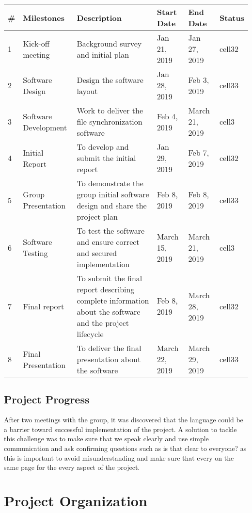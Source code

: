 \documentclass{article}
\begin{document}
\begin{center}
\begin{tabular}{ | m{3em} | m{2cm}| m{3cm} | m{1cm} | m{1cm} | m{1cm} |}
\hline
\textbf{\#} & \textbf{Milestones} & \textbf{Description} & \textbf{Start Date} & \textbf{End Date} & \textbf{Status}  \\
\hline
1 & Kick-off meeting & Background survey and initial plan & Jan 21, 2019 & Jan 27, 2019 & cell32 \\
\hline
2 & Software Design  & Design the software layout & Jan 28, 2019 & Feb 3, 2019 & cell33 \\
\hline
3 & Software Development & Work to deliver the file synchronization software & Feb 4, 2019 & March 21, 2019 & cell3 \\
\hline
4 & Initial Report & To develop and submit the initial report & Jan 29, 2019 & Feb 7, 2019 & cell32 \\
\hline
5 & Group Presentation & To demonstrate  the group initial software design and share the project plan & Feb 8, 2019 & Feb 8, 2019 & cell33 \\
\hline
6 & Software Testing &  To test the software and ensure correct and secured implementation & March 15, 2019 & March 21, 2019 & cell3 \\
\hline
7 & Final report & To submit the final report describing complete information about the software and the project lifecycle & Feb 8, 2019 & March 28, 2019 & cell32 \\
\hline
8 & Final Presentation & To deliver the final presentation about the software & March 22, 2019 & March 29, 2019 & cell33 \\
\hline
\end{tabular}
\end{center}

\subsection{Project Progress}
After two meetings with the group, it was discovered that the language could be a barrier toward successful implementation of the project. A solution to tackle this challenge was to make sure that we speak clearly and use simple communication and ask confirming questions such as is that clear to everyone? as this is important to avoid misunderstanding and make sure that every on the same page for the every aspect of the project.

\section{Project Organization}
\end{document}
